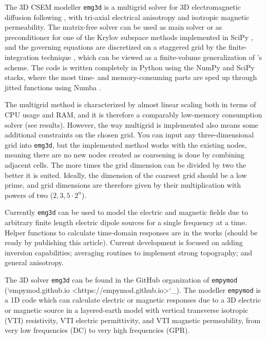 \documentclass[
    paper,
  ]{geophysics}
\newcommand{\emg}[2]{\texttt{emg#1#2}\xspace}
\newcommand{\empymod}{\texttt{empymod}\xspace}
\begin{document}
The 3D CSEM modeller \emg3d \citep{JOSS.19.Werthmuller} is a multigrid
\citep{CMMP.64.Fedorenko} solver for 3D electromagnetic diffusion following
\cite{GP.06.Mulder}, with tri-axial electrical anisotropy and isotropic
magnetic permeability. The matrix-free solver can be used as main solver or as
preconditioner for one of the Krylov subspace methods implemented in SciPy
\citep{NM.20.Virtanen}, and the governing equations are discretized on a
staggered grid by the finite-integration technique \cite{AEU.77.Weiland}, which
can be viewed as a finite-volume generalization of \cite{IEEE.66.Yee}'s scheme.
The code is written completely in Python using the NumPy
\citep{CSE.11.VanDerWalt} and SciPy stacks, where the most time- and
memory-consuming parts are sped up through jitted functions using Numba
\citep{LLVM.15.Lam}.

The multigrid method is characterized by almost linear scaling both in terms
of CPU usage and RAM, and it is therefore a comparably low-memory consumption
solver (see results). However, the way multigrid is implemented also means some
additional constraints on the chosen grid. You can input any three-dimensional
grid into \emg3d, but the implemented method works with the existing nodes,
meaning there are no new nodes created as coarsening is done by combining
adjacent cells. The more times the grid dimension can be divided by two the
better it is suited. Ideally, the dimension of the coarsest grid should be a
low prime, and grid dimensions are therefore given by their multiplication with
powers of two (${2,3,5}·2^n$).

Currently \emg3d can be used to model the electric and magnetic fields due to
arbitrary finite length electric dipole sources for a single frequency at a
time. Helper functions to calculate time-domain responses are in the works
(should be ready by publishing this article). Current development is focused
on adding inversion capabilities; averaging routines to implement strong
topography; and general anisotropy.

The 3D solver \emg3d can be found in the GitHub organization of \empymod
(`empymod.github.io <https://empymod.github.io>`_). The modeller \empymod
\citep{GEO.17.Werthmuller} is a 1D code which can calculate electric or
magnetic responses due to a 3D electric or magnetic source in a layered-earth
model with vertical transverse isotropic (VTI) resistivity, VTI electric
permittivity, and VTI magnetic permeability, from very low frequencies (DC) to
very high frequencies (GPR).
\end{document}
